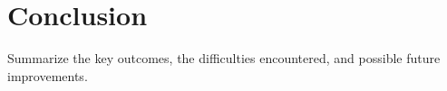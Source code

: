\section{Conclusion}

Summarize the key outcomes, the difficulties encountered, and possible future improvements.
